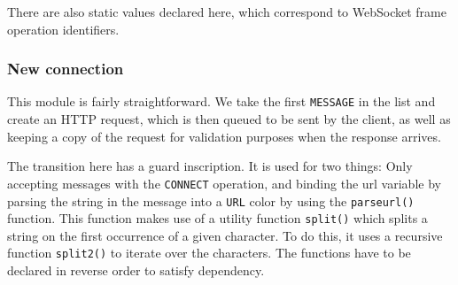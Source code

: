 	There are also static values declared here, which correspond to WebSocket
	frame operation identifiers.
	
	\subsubsection{New connection}
		
		
		This module is fairly straightforward. We take the first \lstinline:MESSAGE:
		in the list and create an HTTP request, which is then queued to be sent by the
		client, as well as keeping a copy of the request for validation purposes when
		the response arrives.
		
		The transition here has a guard inscription. It is used for two things: Only
		accepting messages with the \lstinline:CONNECT: operation, and binding the
		url variable by parsing the string in the message into a \lstinline:URL:
		color by using the \lstinline:parseurl(): function. This function makes use of
		a utility function \lstinline:split():  which splits a string on the first
		occurrence of a given character. To do this, it uses a recursive function
		\lstinline:split2(): to iterate over the characters. The functions have to be
		declared in reverse order to satisfy dependency.
		
		
		
